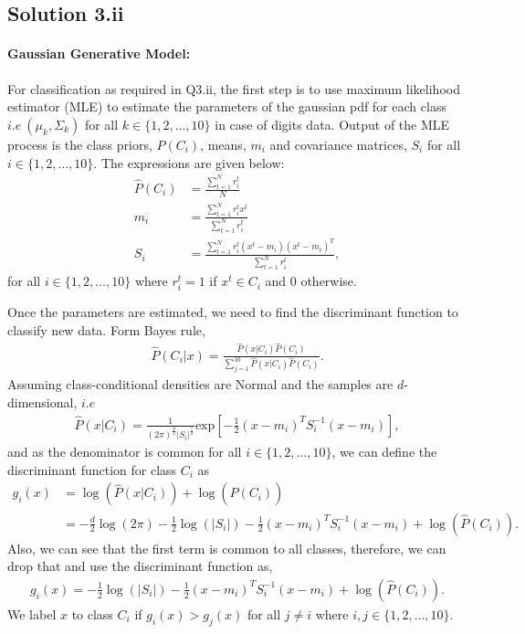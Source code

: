 \subsection*{Solution 3.ii}
\paragraph{Gaussian Generative Model:} For classification as required in Q3.ii, the first step is to use maximum likelihood estimator (MLE) to estimate the parameters of the gaussian pdf for each class $i.e\ (\mu_k, \Sigma_k)$ for all $k \in \{1,2,\ldots, 10\}$ in case of digits data. Output of the MLE process is the class priors, $\hat{P}(C_i)$, means, $m_i$ and covariance matrices, $S_i$ for all $i \in \{1,2,\ldots,10\}$. The expressions are given below:
\begin{align}\label{eq:mle}
\hat{P}(C_i) &= \frac{\sum_{t=1}^N r_i^t}{N} \nonumber\\
m_i &= \frac{\sum_{t=1}^N r_i^t x^t}{\sum_{t=1}^N r_i^t} \nonumber\\
S_i &= \frac{\sum_{t=1}^N r_i^t (x^t-m_i)(x^t-m_i)^T}{\sum_{t=1}^N r_i^t},
\end{align}
for all $i \in \{1,2,\ldots,10\}$ where $r_i^t = 1$ if $x^t \in C_i$ and $0$ otherwise.

Once the parameters are estimated, we need to find the discriminant function to classify new data. Form Bayes rule,
\begin{align*}
\hat{P}(C_i | x) = \frac{\hat{P}(x | C_i)\hat{P}(C_i)}{\sum_{j=1}^{10} \hat{P}(x | C_i)\hat{P}(C_i)}.
\end{align*}
Assuming class-conditional densities are Normal and the samples are $d$-dimensional, $i.e$
\begin{align*}
\hat{P}(x|C_i) = \frac{1}{(2\pi)^{\frac{d}{2}}|S_i|^{\frac{1}{2}}}\text{exp}\left[-\frac{1}{2}(x-m_i)^TS_i^{-1}(x-m_i)\right],
\end{align*}
and as the denominator is common for all $i \in \{1,2,\ldots,10\}$, we can define the discriminant function for class $C_i$ as
\begin{align*}
g_i(x) &= \log(\hat{P}(x|C_i)) + \log(\hat{P}(C_i))\\
&= -\frac{d}{2}\log(2\pi) -\frac{1}{2} \log(|S_i|) -\frac{1}{2}(x-m_i)^TS_i^{-1}(x-m_i) + \log(\hat{P}(C_i)).
\end{align*}
Also, we can see that the first term is common to all classes, therefore, we can drop that and use the discriminant function as,
\begin{align}\label{eq:disc_func}
g_i(x) = -\frac{1}{2} \log(|S_i|) -\frac{1}{2}(x-m_i)^TS_i^{-1}(x-m_i) + \log(\hat{P}(C_i)).
\end{align}
We label $x$ to class $C_i$ if $g_i(x) > g_j(x)$ for all $j \neq i$ where $i,j \in \{1,2,\ldots, 10\}$.
